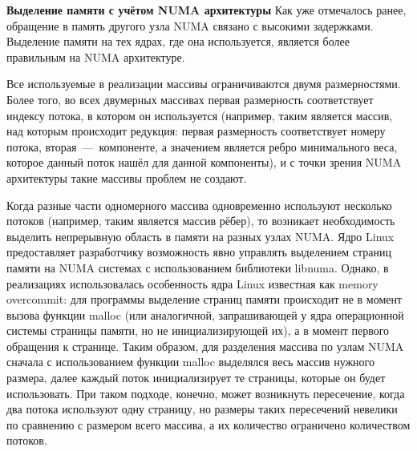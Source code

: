 \documentclass[a4paper,10pt]{extarticle}
\begin{document}
\begin{algorithm}[H]
    \SetAlgoLined
\end{algorithm}



\textbf{Выделение памяти с учётом NUMA архитектуры}
Как уже отмечалось ранее, обращение в память другого узла NUMA связано с высокими задержками. Выделение памяти на тех ядрах, где она используется, является более правильным на NUMA архитектуре.


Все используемые в реализации массивы ограничиваются двумя размерностями. Более того, во всех двумерных массивах первая размерность соответствует индексу потока, в котором он используется (например, таким является массив, над которым происходит редукция: первая размерность соответствует номеру потока, вторая~---~компоненте, а значением является ребро минимального веса, которое данный поток нашёл для данной компоненты), и с точки зрения NUMA архитектуры такие массивы проблем не создают.


Когда разные части одномерного массива одновременно используют несколько потоков (например,  таким является массив рёбер), то возникает необходимость выделить непрерывную область в памяти на разных узлах NUMA. Ядро Linux предоставляет разработчику возможность явно управлять выделением страниц памяти на NUMA системах с использованием библиотеки libnuma. Однако, в реализациях использовалась особенность ядра Linux известная как memory overcommit: для программы выделение страниц памяти происходит не в момент вызова функции malloc (или аналогичной, запрашивающей у ядра операционной системы страницы памяти, но не инициализирующей их), а в момент первого обращения к странице. 
Таким образом, для разделения массива по узлам NUMA сначала с использованием функции malloc выделялся весь массив нужного размера, далее каждый поток инициализирует те страницы, которые он будет использовать. При таком подходе, конечно, может возникнуть пересечение, когда два потока используют одну страницу, но размеры таких пересечений невелики по сравнению с размером всего массива, а их количество ограничено количеством потоков.
\end{document}

